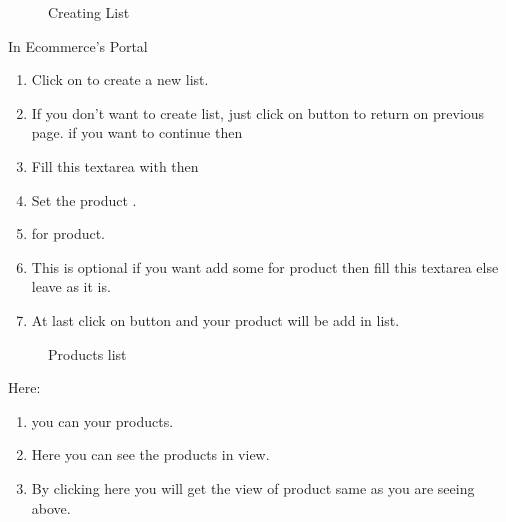 \documentclass[a4paper,10pt,english]{report}
\begin{document}
\begin{figure}[htbp]
\centering
\capstart

\noindent{}
\caption{Creating List}\label{\detokenize{listing:id10}}\label{\detokenize{listing:id4}}\end{figure}

In Ecommerce’s  Portal
\begin{enumerate}
\def\theenumi{\arabic{enumi}}
\def\labelenumi{\theenumi .}
\makeatletter\def\p@enumii{\p@enumi \theenumi .}\makeatother
\item {} 
Click on  to create a new list.

\item {} 
If you don’t want to create list, just click on  button to return on previous page. if you want to continue then

\item {} 
Fill this textarea with  then

\item {} 
Set the product  .

\item {} 
 for product.

\item {} 
This is optional if you want add some  for product then fill this textarea else leave as it is.

\item {} 
At last click on  button and your product will be add in list.

\end{enumerate}

\begin{figure}[htbp]
\centering
\capstart

\noindent{}
\caption{Products list}\label{\detokenize{listing:id11}}\label{\detokenize{listing:id5}}\end{figure}

Here:
\begin{enumerate}
\def\theenumi{\arabic{enumi}}
\def\labelenumi{\theenumi .}
\makeatletter\def\p@enumii{\p@enumi \theenumi .}\makeatother
\item {} 
you can  your products.

\item {} 
Here you can see the products in   view.

\item {} 
By clicking here you will get the  view of product same as you are seeing above.

\end{enumerate}
\end{document}
